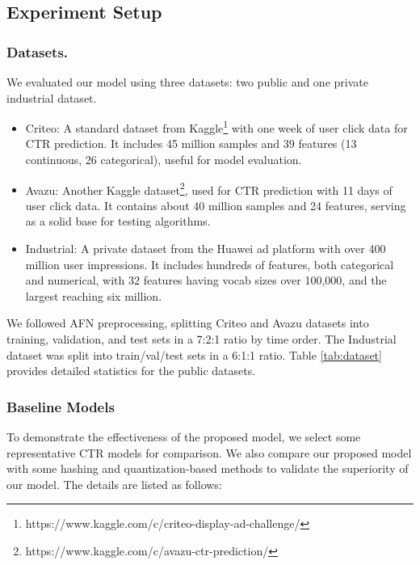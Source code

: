 \subsection{Experiment Setup}
    \subsubsection{Datasets.}
        We evaluated our model using three datasets: two public and one private industrial dataset. 
        \begin{itemize}[leftmargin=*,align=left]
            \item Criteo: A standard dataset from Kaggle\footnote{https://www.kaggle.com/c/criteo-display-ad-challenge/} with one week of user click data for CTR prediction. It includes 45 million samples and 39 features (13 continuous, 26 categorical), useful for model evaluation.

            \item Avazu: Another Kaggle dataset\footnote{https://www.kaggle.com/c/avazu-ctr-prediction/}, used for CTR prediction with 11 days of user click data. It contains about 40 million samples and 24 features, serving as a solid base for testing algorithms.

            \item Industrial: A private dataset from the Huawei ad platform with over 400 million user impressions. It includes hundreds of features, both categorical and numerical, with 32 features having vocab sizes over 100,000, and the largest reaching six million.
        \end{itemize}
        We followed AFN \cite{AFN} preprocessing, splitting Criteo and Avazu datasets into training, validation, and test sets in a 7:2:1 ratio by time order. The Industrial dataset was split into train/val/test sets in a 6:1:1 ratio. Table \ref{tab:dataset} provides detailed statistics for the public datasets.





            
    \subsubsection{Baseline Models}
    To demonstrate the effectiveness of the proposed model, we select some representative CTR models for comparison.
    We also compare our proposed model with some hashing and quantization-based methods to validate the superiority of our model. 
    The details are listed as follows:
         
